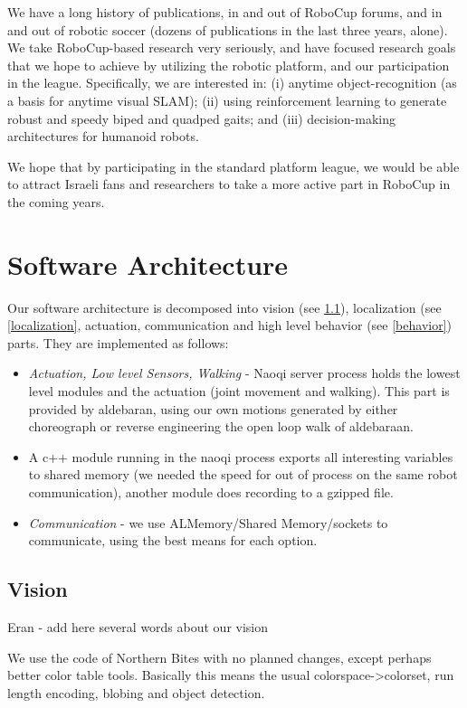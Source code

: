 \documentclass[runningheads,a4paper]{llncs}
\begin{document}
We have a long history of publications, in and out of RoboCup forums, and in
and out of robotic soccer (dozens of publications in the last three years, alone). We
take RoboCup-based research very seriously, and have focused research goals that we
hope to achieve by utilizing the robotic platform, and our participation in the league.
Specifically, we are interested in: (i) anytime object-recognition (as a basis for anytime
visual SLAM); (ii) using reinforcement learning to generate robust and speedy biped
and quadped gaits; and (iii) decision-making architectures for humanoid robots.

We hope that by participating in the standard platform league, we would be able to attract Israeli fans and researchers to take a more active part in RoboCup in the coming years.



\section{Software Architecture}
Our software architecture is decomposed into vision (see \ref{vision}), localization (see \ref{localization}, actuation, communication and high level behavior (see \ref{behavior}) parts. They are implemented as follows:
\begin{itemize}
\item \emph{Actuation, Low level Sensors, Walking} - Naoqi server process holds the lowest level modules and the actuation (joint movement and walking). This part is provided by aldebaran, using our own motions generated by either choreograph or reverse engineering the open loop walk of aldebaraan.
\item A c++ module running in the naoqi process exports all interesting variables to shared memory (we needed the speed for out of process on the same robot communication), another module does recording to a gzipped file.
\item \emph{Communication} - we use ALMemory/Shared Memory/sockets to communicate, using the best means for each option.
\end{itemize}

\subsection{Vision}
\label{vision}
Eran - add here several words about our vision

We use the code of Northern Bites \cite{northern,northern-repo} with no planned changes, except perhaps better color table tools. Basically this means the usual colorspace->colorset, run length encoding, blobing and object detection.
\end{document}
